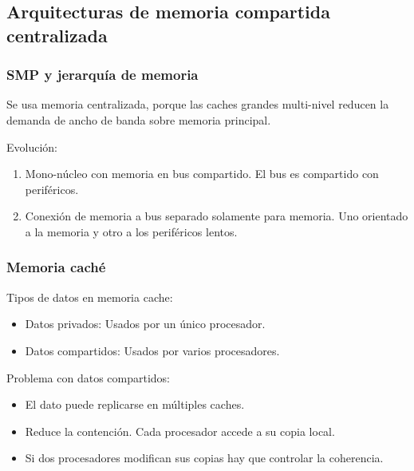 \documentclass[12pt, twoside, openright]{report} %
\begin{document}
\begin{itemize}
     

\subsection{Arquitecturas de memoria compartida centralizada}

\subsubsection{SMP y jerarquía de memoria}



      Se usa memoria centralizada, porque las caches grandes
      multi-nivel reducen la demanda de ancho de banda sobre memoria
      principal.

      Evolución:

      \begin{enumerate}

        
      \item
        Mono-núcleo con memoria en bus compartido. El bus es
        compartido con periféricos.
      \item
        Conexión de memoria a bus separado solamente para memoria. Uno
        orientado a la memoria y otro a los periféricos lentos.
      \end{enumerate}

      
\subsubsection{Memoria caché}


      
      Tipos de datos en memoria cache:

      \begin{itemize}
      
      \item
        Datos privados: Usados por un único procesador.
      \item
        Datos compartidos: Usados por varios procesadores.
      \end{itemize}

      Problema con datos compartidos:

      \begin{itemize}
      
      \item
        El dato puede replicarse en múltiples caches.
      \item
        Reduce la contención. Cada procesador accede a su copia local.
      \item
        Si dos procesadores modifican sus copias hay que controlar la
        coherencia.


\end{itemize}
\end{itemize}
\end{document}
